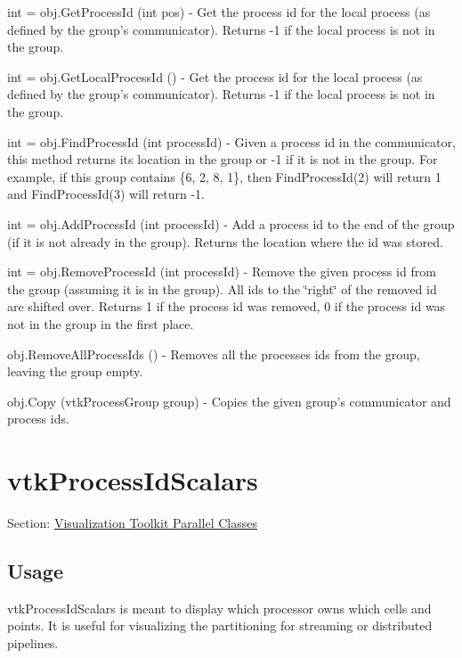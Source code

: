 \begin{DoxyItemize}
\item {\ttfamily int = obj.\-Get\-Process\-Id (int pos)} -\/ Get the process id for the local process (as defined by the group's communicator). Returns -\/1 if the local process is not in the group.  
\item {\ttfamily int = obj.\-Get\-Local\-Process\-Id ()} -\/ Get the process id for the local process (as defined by the group's communicator). Returns -\/1 if the local process is not in the group.  
\item {\ttfamily int = obj.\-Find\-Process\-Id (int process\-Id)} -\/ Given a process id in the communicator, this method returns its location in the group or -\/1 if it is not in the group. For example, if this group contains \{6, 2, 8, 1\}, then Find\-Process\-Id(2) will return 1 and Find\-Process\-Id(3) will return -\/1.  
\item {\ttfamily int = obj.\-Add\-Process\-Id (int process\-Id)} -\/ Add a process id to the end of the group (if it is not already in the group). Returns the location where the id was stored.  
\item {\ttfamily int = obj.\-Remove\-Process\-Id (int process\-Id)} -\/ Remove the given process id from the group (assuming it is in the group). All ids to the \char`\"{}right\char`\"{} of the removed id are shifted over. Returns 1 if the process id was removed, 0 if the process id was not in the group in the first place.  
\item {\ttfamily obj.\-Remove\-All\-Process\-Ids ()} -\/ Removes all the processes ids from the group, leaving the group empty.  
\item {\ttfamily obj.\-Copy (vtk\-Process\-Group group)} -\/ Copies the given group's communicator and process ids.  
\end{DoxyItemize}\hypertarget{vtkparallel_vtkprocessidscalars}{}\section{vtk\-Process\-Id\-Scalars}\label{vtkparallel_vtkprocessidscalars}
Section\-: \hyperlink{sec_vtkparallel}{Visualization Toolkit Parallel Classes} \hypertarget{vtkwidgets_vtkxyplotwidget_Usage}{}\subsection{Usage}\label{vtkwidgets_vtkxyplotwidget_Usage}
vtk\-Process\-Id\-Scalars is meant to display which processor owns which cells and points. It is useful for visualizing the partitioning for streaming or distributed pipelines.

